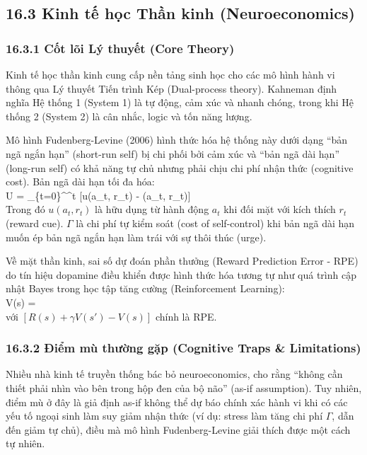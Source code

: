 \documentclass[
]{article}
\begin{document}
\subsection{16.3 Kinh tế học Thần kinh
(Neuroeconomics)}\label{kinh-tux1ebf-hux1ecdc-thux1ea7n-kinh-neuroeconomics}

\subsubsection{16.3.1 Cốt lõi Lý thuyết (Core
Theory)}\label{cux1ed1t-luxf5i-luxfd-thuyux1ebft-core-theory-62}

Kinh tế học thần kinh cung cấp nền tảng sinh học cho các mô hình hành vi
thông qua Lý thuyết Tiến trình Kép (Dual-process theory). Kahneman định
nghĩa Hệ thống 1 (System 1) là tự động, cảm xúc và nhanh chóng, trong
khi Hệ thống 2 (System 2) là cân nhắc, logic và tốn năng lượng.

Mô hình Fudenberg-Levine (2006) hình thức hóa hệ thống này dưới dạng
``bản ngã ngắn hạn'' (short-run self) bị chi phối bởi cảm xúc và ``bản
ngã dài hạn'' (long-run self) có khả năng tự chủ nhưng phải chịu chi phí
nhận thức (cognitive cost). Bản ngã dài hạn tối đa hóa: \[
\] U = \sum\_\{t=0\}\^{}\infty \delta\^{}t {[}u(a\_t, r\_t) -
\Gamma(a\_t, r\_t){]} \[
\] Trong đó \(u(a_t, r_t)\) là hữu dụng từ hành động \(a_t\) khi đối mặt
với kích thích \(r_t\) (reward cue). \(\Gamma\) là chi phí tự kiểm soát
(cost of self-control) khi bản ngã dài hạn muốn ép bản ngã ngắn hạn làm
trái với sự thôi thúc (urge).

Về mặt thần kinh, sai số dự đoán phần thưởng (Reward Prediction Error -
RPE) do tín hiệu dopamine điều khiển được hình thức hóa tương tự như quá
trình cập nhật Bayes trong học tập tăng cường (Reinforcement Learning):
\[
\] \Delta V(s) = \alpha [R(s) + \gamma V(s') - V(s)] \[
\] với \([R(s) + \gamma V(s') - V(s)]\) chính là RPE.

\subsubsection{16.3.2 Điểm mù thường gặp (Cognitive Traps \&
Limitations)}\label{ux111iux1ec3m-muxf9-thux1b0ux1eddng-gux1eb7p-cognitive-traps-limitations-113}

Nhiều nhà kinh tế truyền thống bác bỏ neuroeconomics, cho rằng ``không
cần thiết phải nhìn vào bên trong hộp đen của bộ não'' (as-if
assumption). Tuy nhiên, điểm mù ở đây là giả định as-if không thể dự báo
chính xác hành vi khi có các yếu tố ngoại sinh làm suy giảm nhận thức
(ví dụ: stress làm tăng chi phí \(\Gamma\), dẫn đến giảm tự chủ), điều
mà mô hình Fudenberg-Levine giải thích được một cách tự nhiên.
\end{document}
